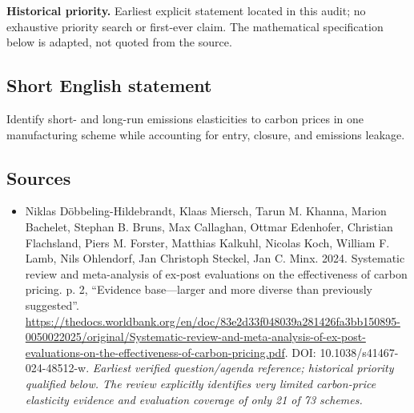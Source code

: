 \documentclass[11pt]{article}
\begin{document}
\par\textbf{Historical priority.} Earliest explicit statement located in this audit; no exhaustive priority search or first-ever claim. The mathematical specification below is adapted, not quoted from the source.

\subsection{Short English statement}
Identify short- and long-run emissions elasticities to carbon prices in one manufacturing scheme while accounting for entry, closure, and emissions leakage.

\subsection{Sources}
\begin{itemize}\raggedright
\item[\textnormal{[S1]}]\hypertarget{source:30007717:1}{} Niklas Döbbeling-Hildebrandt, Klaas Miersch, Tarun M. Khanna, Marion Bachelet, Stephan B. Bruns, Max Callaghan, Ottmar Edenhofer, Christian Flachsland, Piers M. Forster, Matthias Kalkuhl, Nicolas Koch, William F. Lamb, Nils Ohlendorf, Jan Christoph Steckel, Jan C. Minx. 2024. Systematic review and meta-analysis of ex-post evaluations on the effectiveness of carbon pricing. p. 2, “Evidence base—larger and more diverse than previously suggested”.
\url{https://thedocs.worldbank.org/en/doc/83e2d33f048039a281426fa3bb150895-0050022025/original/Systematic-review-and-meta-analysis-of-ex-post-evaluations-on-the-effectiveness-of-carbon-pricing.pdf}.
DOI: 10.1038/s41467-024-48512-w.
{\small\textit{Earliest verified question/agenda reference; historical priority qualified below. The review explicitly identifies very limited carbon-price elasticity evidence and evaluation coverage of only 21 of 73 schemes.}}
\end{itemize}
\end{document}

